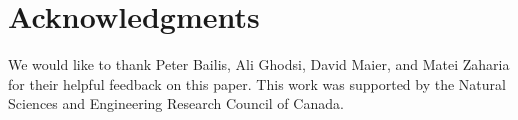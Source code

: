 \section*{Acknowledgments}
We would like to thank Peter Bailis, Ali Ghodsi, David Maier, and Matei Zaharia
for their helpful feedback on this paper.  This work was supported by the
Natural Sciences and Engineering Research Council of Canada.
